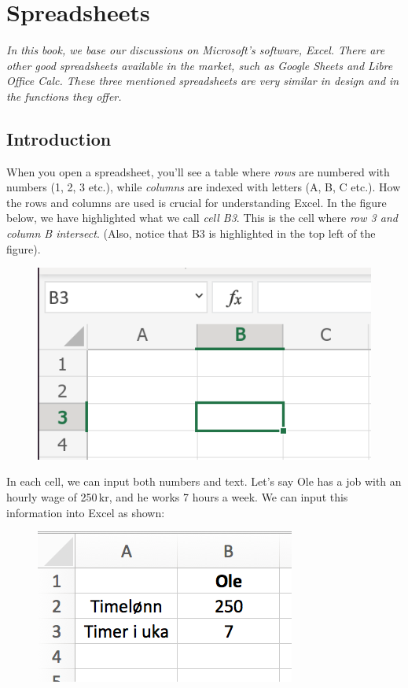 



\section{Spreadsheets}

\textit{In this book, we base our discussions on Microsoft's software, Excel. There are other good spreadsheets available in the market, such as Google Sheets and Libre Office Calc. These three mentioned spreadsheets are very similar in design and in the functions they offer.}

\subsection{Introduction}

When you open a spreadsheet, you'll see a table where \textit{rows} are numbered with numbers (1, 2, 3 etc.), while \textit{columns} are indexed with letters (A, B, C etc.). How the rows and columns are used is crucial for understanding Excel. In the figure below, we have highlighted what we call \textit{cell B\textsl{3}}. This is the cell where \textsl{row 3 and column B intersect}. (Also, notice that B3 is highlighted in the top left of the figure).

\begin{figure}[H]
	\centering
	\includegraphics[scale=0.25]{figs/B3}
\end{figure}
In each cell, we can input both numbers and text. Let's say Ole has a job with an hourly wage of 250\,kr, and he works 7 hours a week. We can input this information into Excel as shown:
\begin{figure}[H]
	\centering
	\includegraphics[scale=0.35]{figs/ex2}
\end{figure}
